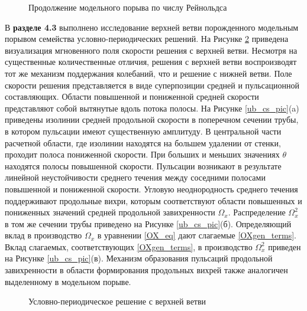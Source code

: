 \begin{figure}
\caption{Продолжение модельного порыва по числу Рейнольдса}
\label{contin_pic}
\end{figure} 

В \textbf{разделе 4.3} выполнено исследование верхней ветви порожденного модельным порывом семейства условно-периодических решений. На Рисунке \ref{3D_ub_pic} приведена визуализация мгновенного поля скорости решения с верхней ветви. Несмотря на существенные количественные отличия, решения с верхней ветви воспроизводят тот же механизм поддержания колебаний, что и решение с нижней ветви. Поле скорости решения представляется в виде суперпозиции средней и пульсационной составляющих. Области повышенной и пониженной средней скорости представляют собой вытянутые вдоль потока полосы. На Рисунке \ref{ub_cs_pic}(a) приведены изолинии средней продольной скорости в поперечном сечении трубы, в котором пульсации имеют существенную амплитуду. В центральной части расчетной области, где изолинии находятся на большем удалении от стенки, проходит полоса пониженной скорости. При больших и меньших значениях $\theta$ находятся полосы повышенной скорости. Пульсации возникают в результате линейной неустойчивости среднего течения между соседними полосами повышенной и пониженной скорости. Угловую неоднородность среднего течения поддерживают продольные вихри, которым соответствуют области повышенных и пониженных значений средней продольной завихренности $\Omega_x$. Распределение $\Omega^2_x$ в том же сечении трубы приведено на Рисунке \ref{ub_cs_pic}(б). Определяющий вклад в производство $\Omega_x$ в уравнении \eqref{OX_eq} дают слагаемые \eqref{OXgen_terms}. Вклад слагаемых, соответствующих \eqref{OXgen_terms}, в производство $\Omega^2_x$ приведен на Рисунке \ref{ub_cs_pic}(в). Механизм образования пульсаций продольной завихренности в области формирования продольных вихрей также аналогичен выделенному в модельном порыве. 


\begin{figure}
\caption{Условно-периодическое решение с верхней ветви}
\label{3D_ub_pic}
\end{figure} 


